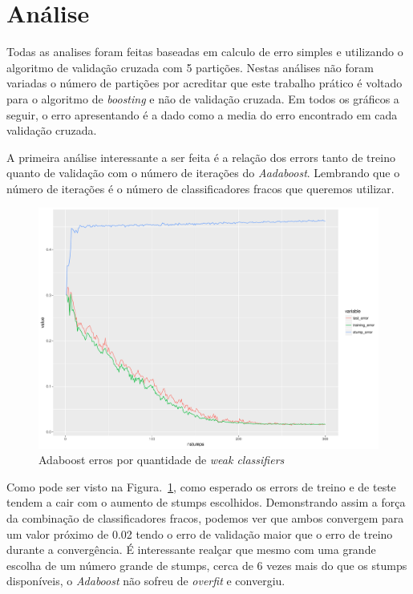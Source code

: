 \section{Análise}
Todas as analises foram feitas baseadas em calculo de erro simples e utilizando o algoritmo de validação cruzada com 5 partições. Nestas análises não foram variadas o número de partições por acreditar que este trabalho prático é voltado para o algoritmo de \emph{boosting} e não de validação cruzada. Em todos os gráficos a seguir, o erro apresentando é a dado como a media do erro encontrado em cada validação cruzada.


A primeira análise interessante a ser feita é a relação dos errors tanto de treino quanto de validação com o número de iterações do \emph{Aadaboost}. Lembrando que o número de iterações é o número de classificadores fracos que queremos utilizar.

\begin{figure}[h]
  \includegraphics[width=\linewidth]{imgs/accuracy.pdf}
  \caption{Adaboost erros por quantidade de \emph{weak classifiers}}
  \label{fig:adaboostAccuracy}
\end{figure}

Como pode ser visto na Figura.~\ref{fig:adaboostAccuracy}, como esperado os errors de treino e de teste tendem a cair com o aumento de stumps escolhidos. Demonstrando assim a força da combinação de classificadores fracos, podemos ver que ambos convergem para um valor próximo de 0.02 tendo o erro de validação maior que o erro de treino durante a convergência. É interessante realçar que mesmo com uma grande escolha de um número grande de stumps, cerca de 6 vezes mais do que os stumps disponíveis, o \emph{Adaboost} não sofreu de \emph{overfit} e convergiu.

